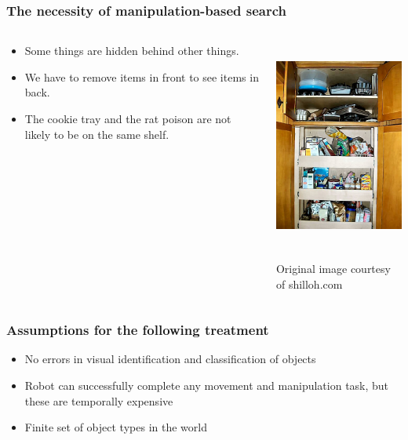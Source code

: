 \begin{frame}
  \frametitle{The necessity of manipulation-based search}
  \vspace{-0.3in}
  \begin{columns}
    \begin{column}{0.6\textwidth}
      \begin{itemize}
        \item Some things are hidden behind other things.
        \item We have to remove items in front to see items in back.
        \item The cookie tray and the rat poison are not likely to be on the same shelf.
      \end{itemize}
    \end{column}
    \begin{column}{0.4\textwidth}
      \begin{center}
        \includegraphics[height=2.7in]{img/kitchen-organization.jpg}

        \tiny{Original image courtesy of shilloh.com}
      \end{center}
    \end{column}
  \end{columns}
\end{frame}

\begin{frame}
  \frametitle{Assumptions for the following treatment}
  \begin{itemize}
  \item No errors in  visual identification and classification of objects
  \item Robot can successfully complete any movement and manipulation task, but
    these are temporally expensive
  \item Finite set of object types in the world
  \end{itemize}
\end{frame}
